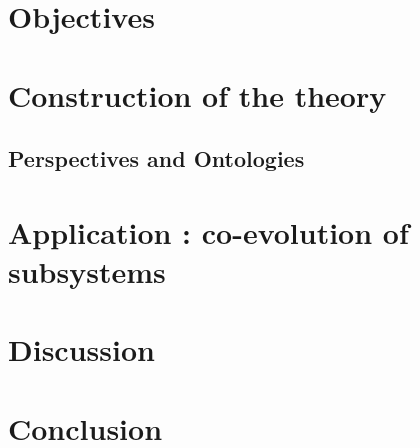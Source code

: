 \section*{Objectives}




\section*{Construction of the theory}

\subsection*{Perspectives and Ontologies}




\section*{Application : co-evolution of subsystems}



\section*{Discussion}



\section*{Conclusion}











